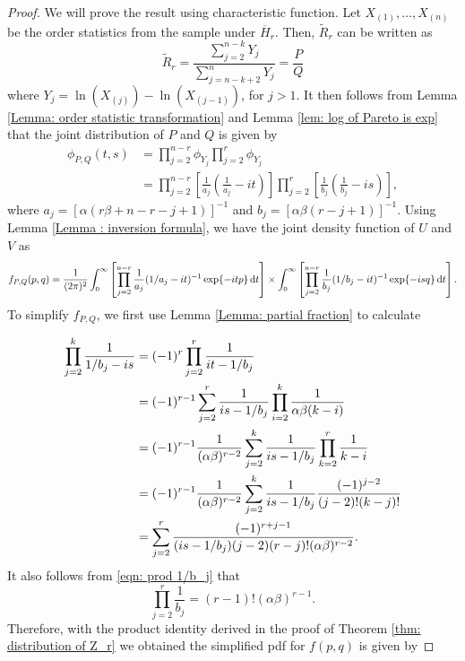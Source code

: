\documentclass{report}
\begin{document}
    
\begin{proof}
    We will prove the result using characteristic function. Let $X_{(1)},\ldots,X_{(n)}$ be the order statistics from the sample under $\overline{H}_r$. Then, $\tilde R_r$ can be written as
    \[ 
        \tilde R_r = \frac{\sum_{j=2}^{n-k} Y_j}{\sum_{j=n-k+2}^n Y_j} = \frac{P}{Q}
    \]
    where $Y_j = \ln(X_{(j)}) - \ln(X_{(j-1)})$, for $j > 1$. It then follows from Lemma \ref{Lemma: order statistic transformation} and Lemma \ref{lem: log of Pareto is exp}
    that the joint distribution of $P$ and $Q$ is given by
    \begin{align*}
        \phi_{P,Q}(t,s) &= \prod_{j=2}^{n-r} \phi_{Y_j} \prod_{j=2}^{r} \phi_{Y_j}
        \\
        &= \prod_{j=2}^{n-r} \left[\frac{1}{a_j}\left(\frac{1}{a_j}-it\right)\right] \prod_{j=2}^{r} \left[\frac{1}{b_j}\left(\frac{1}{b_j}-is\right)\right],
    \end{align*}
    where $a_j = [\alpha(r\beta + n - r -j+1)]^{-1}$ and $b_j = [\alpha \beta(r-j+1)]^{-1}$. Using Lemma \ref{Lemma : inversion formula}, we have the joint density function of $U$ and $V$ as
    \[ 
        f_{P,Q}(p,q)= \frac{1}{(2\pi)^2} \int_0^\infty \left[ \prodj[2]{n-r} \frac{1}{a_j}(1/a_j -it)^{-1}\exp{-itp}\dd{t}\right] \times \int_0^\infty \left[ \prodj[2]{n-r} \frac{1}{b_j}(1/b_j -it)^{-1}\exp{-isq}\dd{t}\right].
    \]
    To simplify $f_{P,Q}$, we first use Lemma \ref{Lemma: partial fraction} to calculate

    \begin{align*}
        \prod_{j=2}^k \frac{1}{1/b_j - is} &= (-1)^{r} \prodj[2]{r} \frac{1}{it-1/b_j}
        \\
        &= (-1)^{r-1} \sum_{j=2}^r \frac{1}{is - 1/b_j} \prod_{i=2}^k \frac{1}{\alpha \beta(k-i)}
        \\
        &= (-1)^{r-1} \frac{1}{(\alpha\beta)^{r-2}} \sum_{j=2}^k \frac{1}{is - 1/b_j} \prod_{k=2}^r \frac{1}{k-i}
        \\
        &= (-1)^{r-1} \frac{1}{(\alpha\beta)^{r-2}} \sum_{j=2}^k \frac{1}{is - 1/b_j} \frac{(-1)^{j-2}}{(j-2)!(k-j)!}
        \\
        &= \sum_{j=2}^r \frac{(-1)^{r+j-1}}{(is-1/b_j)(j-2)(r-j)!(\alpha \beta)^{r-2}}.
    \end{align*}
    It also follows from \eqref{eqn: prod 1/b_j} that
    \[ 
        \prod_{j=2}^r \frac{1}{b_j} = (r-1)!(\alpha\beta)^{r-1}.
    \]
    Therefore, with the product identity derived in the proof of Theorem \ref{thm: distribution of Z_r} we
    obtained the simplified pdf for $f(p,q)$ is given by


\end{proof}
\end{document}
